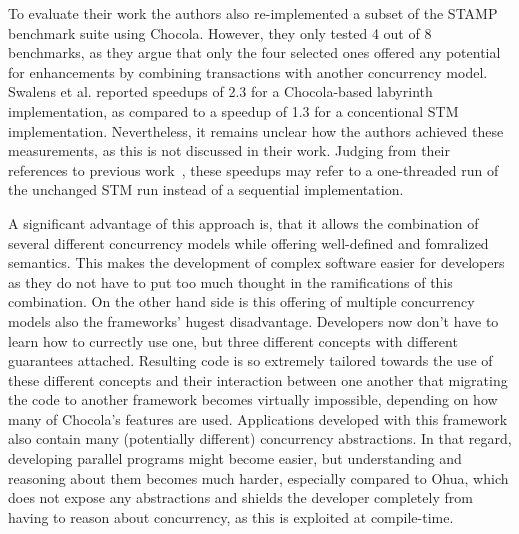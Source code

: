 To evaluate their work the authors also re-implemented a subset of the STAMP benchmark suite using Chocola.
However, they only tested 4 out of 8 benchmarks, as they argue that only the four selected ones offered any potential for enhancements by combining transactions with another concurrency model.
Swalens et al. reported speedups of 2.3 for a Chocola-based labyrinth implementation, as compared to a speedup of 1.3 for a concentional STM implementation.
Nevertheless, it remains unclear how the authors achieved these measurements, as this is not discussed in their work.
Judging from their references to previous work~\cite{swalens2016transactional, swalens2017transactional}, these speedups may refer to a one-threaded run of the unchanged STM run instead of a sequential implementation.

A significant advantage of this approach is, that it allows the combination of several different concurrency models while offering well-defined and fomralized semantics.
This makes the development of complex software easier for developers as they do not have to put too much thought in the ramifications of this combination.
On the other hand side is this offering of multiple concurrency models also the frameworks' hugest disadvantage.
Developers now don't have to learn how to currectly use one, but three different concepts with different guarantees attached.
Resulting code is so extremely tailored towards the use of these different concepts and their interaction between one another that migrating the code to another framework becomes virtually impossible, depending on how many of Chocola's features are used.
Applications developed with this framework also contain many (potentially different) concurrency abstractions.
In that regard, developing parallel programs might become easier, but understanding and reasoning about them becomes much harder, especially compared to Ohua, which does not expose any abstractions and shields the developer completely from having to reason about concurrency, as this is exploited at compile-time.


